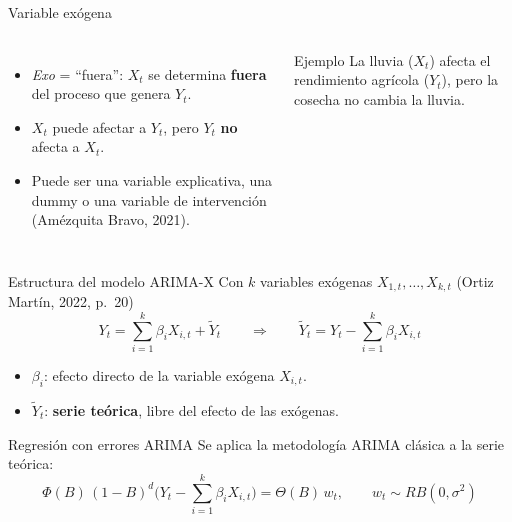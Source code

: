 \documentclass[aspectratio=169,11pt]{beamer}
\begin{document}
\begin{frame}[t]{Variable exógena}
  \begin{columns}[c]
    \begin{itemize}
      \item \emph{Exo} = ``fuera'': $X_t$ se determina \textbf{fuera} del proceso que genera $Y_t$.
      \item $X_t$ puede afectar a $Y_t$, pero $Y_t$ \textbf{no} afecta a $X_t$.
      \item Puede ser una variable explicativa, una dummy o una variable de intervención (Amézquita Bravo, 2021).
    \end{itemize}
    \vspace{2mm}
    \begin{exampleblock}{Ejemplo}
      La lluvia ($X_t$) afecta el rendimiento agrícola ($Y_t$), pero la cosecha no cambia la lluvia.
    \end{exampleblock}
    \centering
  \end{columns}
\end{frame}

\begin{frame}[t]{Estructura del modelo ARIMA-X}
  Con $k$ variables exógenas $X_{1,t},\dots,X_{k,t}$ \hfill {\footnotesize (Ortiz Martín, 2022, p.~20)}
  \[
    Y_t = \sum_{i=1}^{k}\beta_i X_{i,t} + \tilde{Y}_t
    \qquad\Longrightarrow\qquad
    \tilde{Y}_t = Y_t - \sum_{i=1}^{k}\beta_i X_{i,t}
  \]
  \begin{itemize}
    \item $\beta_i$: efecto directo de la variable exógena $X_{i,t}$.
    \item $\tilde{Y}_t$: \textbf{serie teórica}, libre del efecto de las exógenas.
  \end{itemize}
  \vspace{1mm}
  \begin{block}{Regresión con errores ARIMA}
    Se aplica la metodología ARIMA clásica a la serie teórica:
    \[
      \Phi(B)\,(1-B)^d\Big(Y_t - \sum_{i=1}^{k}\beta_i X_{i,t}\Big) = \Theta(B)\,w_t,
      \qquad w_t\sim RB(0,\sigma^2)
    \]
  \end{block}
\end{frame}
\end{document}
